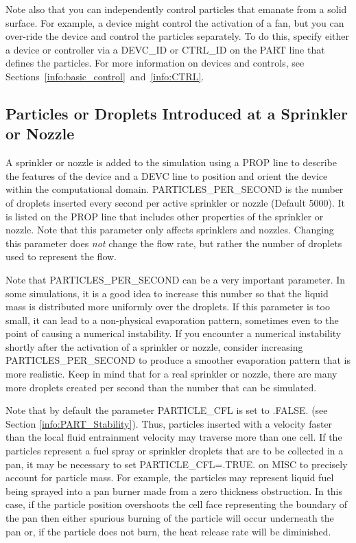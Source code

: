 \documentclass[11pt]{book}
\begin{document}
Note also that you can independently control particles that emanate from a solid surface. For example, a device might control the
activation of a fan, but you can over-ride the device and control the particles separately. To do this, specify either
a device or controller via a {\ct DEVC\_ID} or {\ct CTRL\_ID} on the {\ct PART} line that defines the particles. For more
information on devices and controls, see Sections~\ref{info:basic_control}~and~\ref{info:CTRL}.



\subsection{Particles or Droplets Introduced at a Sprinkler or Nozzle}
\label{info:sprinkler_droplets}

A sprinkler or nozzle is added to the simulation using a {\ct PROP} line to describe the features of the device and a {\ct DEVC} line to position and orient the
device within the computational domain.
{\ct PARTICLES\_PER\_SECOND} is the  number of droplets inserted every
second per active sprinkler or nozzle (Default 5000). It is listed on the {\ct PROP} line that includes other properties of
the sprinkler or nozzle. Note that this parameter only affects sprinklers and nozzles.
Changing this parameter does {\em not} change the flow rate, but rather the number
of droplets used to represent the flow.

Note that {\ct PARTICLES\_PER\_SECOND} can be a very important parameter. In some simulations, it is a good idea to increase this number so that the
liquid mass is distributed more uniformly over the droplets. If this parameter is too small, it can lead to a non-physical evaporation pattern, sometimes even to the
point of causing a numerical instability. If you encounter a numerical instability shortly after the activation of a sprinkler or nozzle, consider increasing
{\ct PARTICLES\_PER\_SECOND} to produce a smoother evaporation pattern that is more realistic. Keep in mind that for a real sprinkler or nozzle, there are many more
droplets created per second than the number that can be simulated.

Note that by default the parameter {\ct PARTICLE\_CFL} is set to {\ct .FALSE.} (see Section \ref{info:PART_Stability}).  Thus, particles inserted with a velocity faster than the local fluid entrainment velocity may traverse more than one cell.  If the particles represent a fuel spray or sprinkler droplets that are to be collected in a pan, it may be necessary to set {\ct PARTICLE\_CFL=.TRUE.} on {\ct MISC} to precisely account for particle mass.  For example, the particles may represent liquid fuel being sprayed into a pan burner made from a zero thickness obstruction.  In this case, if the particle position overshoots the cell face representing the boundary of the pan then either spurious burning of the particle will occur underneath the pan or, if the particle does not burn, the heat release rate will be diminished.
\end{document}
